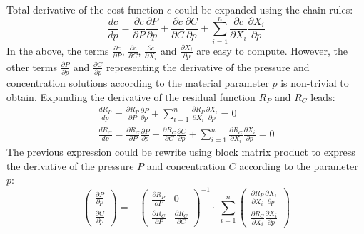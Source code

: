 \documentclass[11pt]{article}
\begin{document}
Total derivative of the cost function $c$ could be expanded using the chain rules:
\begin{equation}
\frac{dc}{dp} = 
\frac{\partial c}{\partial P}\frac{\partial P}{\partial p} + 
\frac{\partial c}{\partial C}\frac{\partial C}{\partial p} + 
\sum_{i=1}^n \frac{\partial c}{\partial X_i}\frac{\partial X_i}{\partial p}
\end{equation}
In the above, the terms $\frac{\partial c}{\partial P}$, $\frac{\partial c}{\partial C}$, $\frac{\partial c}{\partial X_i}$ and $\frac{\partial X_i}{\partial p}$ are easy to compute. However, the other terms $\frac{\partial P}{\partial p}$ and $\frac{\partial C}{\partial p}$ representing the derivative of the pressure and concentration solutions according to the material parameter $p$ is non-trivial to obtain. Expanding the derivative of the residual function $R_P$ and $R_C$ leads:
\begin{subequations}
\begin{align}
\frac{dR_P}{dp} =
\frac{\partial R_P}{\partial P}\frac{\partial P}{\partial p} +
\sum_{i=1}^n \frac{\partial R_P}{\partial X_i}\frac{\partial X_i}{\partial p} = 0
\\
\frac{dR_C}{dp} = 
\frac{\partial R_C}{\partial P}\frac{\partial P}{\partial p} +
\frac{\partial R_C}{\partial C}\frac{\partial C}{\partial p} +
\sum_{i=1}^n \frac{\partial R_C}{\partial X_i}\frac{\partial X_i}{\partial p} = 0
\end{align}
\end{subequations}
The previous expression could be rewrite using block matrix product to express the derivative of the pressure $P$ and concentration $C$ according to the parameter $p$:
\begin{equation}
\begin{pmatrix}
\frac{\partial P}{\partial p} \\ \frac{\partial C}{\partial p}
\end{pmatrix}
= -
\begin{pmatrix}
\frac{\partial R_P}{\partial P} & 0 \\ 
\frac{\partial R_C}{\partial P} & \frac{\partial R_C}{\partial C}
\end{pmatrix}^{-1} \cdot
\ \sum_{i=1}^n 
\begin{pmatrix}
\frac{\partial R_P}{\partial X_i}\frac{\partial X_i}{\partial p} \\ \frac{\partial R_C}{\partial X_i}\frac{\partial X_i}{\partial p}
\end{pmatrix}
\end{equation}
\end{document}

